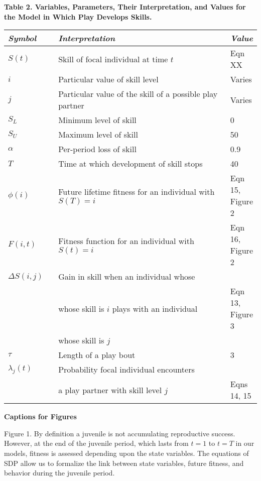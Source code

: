 \documentclass[12pt, letterpaper, fleqn]{article}
\begin{document}
%
\clearpage
\hspace*{-2cm}
\noindent 
\textbf{Table 2. Variables, Parameters, Their Interpretation, and Values for the Model in Which Play Develops Skills.}
%

\hspace*{-2cm}\begin{tabular}{p{0.2\linewidth} p{0.7\linewidth} p{0.2\linewidth}}
{\sl Symbol} 	& {\sl Interpretation} 						& {\sl Value}	\\ \hline
$S(t)$		&Skill of focal individual at time $t$				&Eqn {\color{red}XX}\\
$i$		&Particular value of skill level				&Varies		\\
$j$		&Particular value of the skill of a possible play partner	&Varies		\\
$S_L$		&Minimum level of skill						&0		\\
$S_U$		&Maximum level of skill						&50		\\ 
$\alpha$	&Per-period loss of skill					&0.9		\\
$T$		&Time at which development of skill stops			&40		\\
$\phi(i)$	&Future lifetime fitness for an individual with $S(T)=i$	&Eqn 15, Figure 2\\
$F(i,t)$	&Fitness function for an individual with $S(t)=i$		&Eqn 16, Figure 2\\
$\Delta S(i,j)$	&Gain in skill when an individual whose 			&		\\
		& whose skill is $i$ plays with an individual			&Eqn 13, Figure 3\\
		& whose skill is $j$ 						&		\\
$\tau$		&Length of a play bout						&3		\\
$\lambda_j(t)$	&Probability focal individual encounters			&		\\
		&a play partner with skill level $j$				&Eqns 14, 15	\\
\end{tabular}
 
% 
%

\clearpage
\textbf {Captions for Figures}

%
%

%
Figure 1.  
%
By definition a juvenile is not accumulating reproductive success.  
%
However, at the end of the juvenile period, which lasts from $t=1$ to $t=T$ in our models, fitness is assessed depending upon the state variables. 
%
The equations of SDP allow us to formalize the link between state variables, future fitness, and behavior during the juvenile period. 
\\
\end{document}
